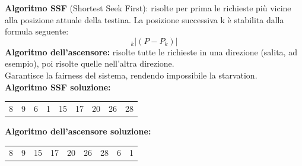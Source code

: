\documentclass{article}
\begin{document}
\textbf{Algoritmo SSF} (Shortest Seek First): risolte per prima le richieste più vicine alla posizione attuale della testina. La posizione successiva k è stabilita dalla
formula seguente:
\[ \DeclareMathOperator{\argmin}{arg\,min}_k|(P-P_{k})| \]
\textbf{Algoritmo dell’ascensore:} risolte tutte le richieste in una direzione (salita, ad esempio), poi risolte quelle nell’altra direzione.\\
Garantisce la fairness del sistema, rendendo impossibile la starvation.\\

\textbf{Algoritmo SSF soluzione:}
\vskip 0.4cm

\begin{tabular}{|p{}|p{}|p{}|p{}|p{}|p{}|p{}|p{}|p{}|}

\hline
       &  &  &  &  &  &  &  &          \\
\hline
8     & 9 & 6 & 1 & 15 & 17 & 20 & 26 & 28      \\

\hline
\end{tabular}

\vskip 0.8cm
\textbf{Algoritmo dell’ascensore soluzione:}
\vskip 0.4cm

\begin{tabular}{|p{}|p{}|p{}|p{}|p{}|p{}|p{}|p{}|p{}|}

\hline
       &  &  &  &  &  &  &  &          \\
\hline
8     & 9 & 15 & 17 & 20 & 26 & 28 & 6 & 1      \\

\hline
\end{tabular}

\vskip 0.8cm
\end{document}
